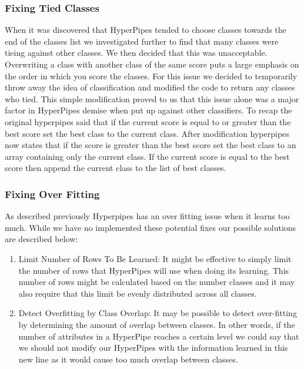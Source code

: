 \subsubsection{Fixing Tied Classes}
When it was discovered that HyperPipes tended to choose classes 
towards the end of the classes list we investigated further to 
find that many classes were tieing against other classes. We 
then decided that this was unacceptable. Overwriting a class 
with another class of the same score puts a large emphasis on 
the order in which you score the classes. For this issue we 
decided to temporarily throw away the idea of classification 
and modified the code to return any classes who tied. This 
simple modification proved to us that this issue alone was a 
major factor in HyperPipes demise when put up against other 
classifiers. To recap the original hyperpipes said that if 
the current score is equal to or greater than the best score 
set the best class to the current class. After modification 
hyperpipes now states that if the score is greater than the 
best score set the best class to an array containing only the 
current class. If the current score is equal to the best score 
then append the current class to the list of best classes.
\subsubsection{Fixing Over Fitting}
As described previously Hyperpipes has an over fitting issue 
when it learns too much. While we have no implemented these 
potential fixes our possible solutions are described below:

\begin{enumerate}
\item Limit Number of Rows To Be Learned: 
	It might be effective to simply limit the number of rows 
	that HyperPipes will use when doing its learning. This 
	number of rows might be calculated based on the number 
	classes and it may also require that this limit be 
	evenly distributed across all classes.
\item Detect Overfitting by Class Overlap:
	It may be possible to detect over-fitting by determining 
	the amount of overlap between classes. In other words, 
	if the number of attributes in a HyperPipe reaches a 
	certain level we could say that we should not modify our 
	HyperPipes with the information learned in this new line
	as it would cause too much overlap between classes.
\end{enumerate}


